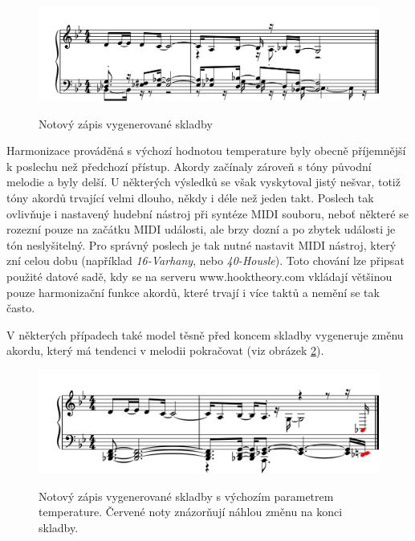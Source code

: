 \begin{figure}[h]\centering
    \centering
    \includegraphics[width=0.8\linewidth]{obrazky/KratkaSkladbaHarmonizovanaLowNoty.png}\\[1pt]  
    \caption{Notový zápis vygenerované skladby}    
    \label{obrazekKratkaSkladbaHarmonizovanaLowNoty}
\end{figure}
\par

Harmonizace prováděná s výchozí hodnotou temperature 
byly obecně příjemnější k poslechu než předchozí přístup.
Akordy začínaly zároveň s tóny původní melodie a byly delší.
U některých výsledků se však vyskytoval jistý nešvar, 
totiž tóny akordů trvající velmi dlouho, někdy i déle než jeden takt.
Poslech tak ovlivňuje i nastavený hudební nástroj při syntéze MIDI souboru,
neboť některé se rozezní pouze na začátku MIDI události, ale brzy dozní
a po zbytek události je tón neslyšitelný.
Pro správný poslech je tak nutné nastavit MIDI nástroj, který zní celou dobu
(například \emph{16-Varhany}, nebo \emph{40-Housle}).
Toto chování lze připsat použité datové sadě,
kdy se na serveru www.hooktheory.com vkládají většinou pouze harmonizační funkce akordů,
které trvají i více taktů a nemění se tak často.
\par
V některých případech také model těsně před koncem skladby vygeneruje změnu akordu,
který má tendenci v melodii pokračovat (viz obrázek \ref{obrazekKratkaSkladbaHarmonizovanaDefNoty}).

\begin{figure}[h]\centering
    \centering
    \includegraphics[width=0.8\linewidth]{obrazky/KratkaSkladbaHarmonizovanaDefNoty-1.png}\\[1pt]  
    \caption{Notový zápis vygenerované skladby s výchozím parametrem temperature. 
    Červené noty znázorňují náhlou změnu na konci skladby.}    
    \label{obrazekKratkaSkladbaHarmonizovanaDefNoty}
\end{figure}
\par

